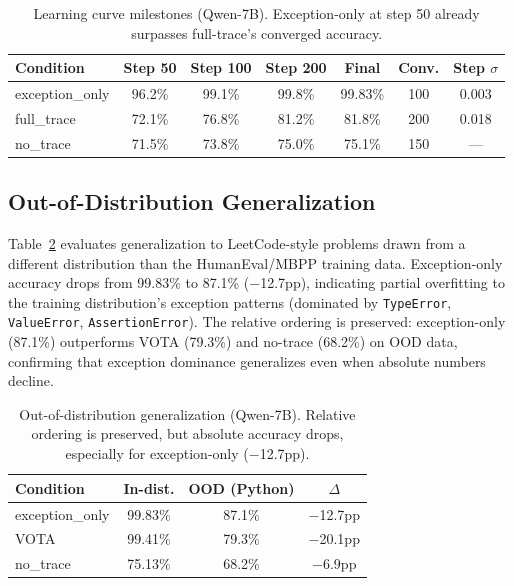 \documentclass[11pt]{article}
\begin{document}
\begin{table}[t]
\centering
\caption{Learning curve milestones (Qwen-7B). Exception-only at step 50 already surpasses full-trace's converged accuracy.}
\label{tab:dynamics}
\small
\begin{tabular}{lcccccc}
\toprule
\textbf{Condition} & \textbf{Step 50} & \textbf{Step 100} & \textbf{Step 200} & \textbf{Final} & \textbf{Conv.} & \textbf{Step $\sigma$} \\
\midrule
exception\_only & 96.2\% & 99.1\% & 99.8\% & 99.83\% & 100 & 0.003 \\
full\_trace & 72.1\% & 76.8\% & 81.2\% & 81.8\% & 200 & 0.018 \\
no\_trace & 71.5\% & 73.8\% & 75.0\% & 75.1\% & 150 & --- \\
\bottomrule
\end{tabular}
\end{table}

\subsection{Out-of-Distribution Generalization}
\label{sec:exp-ood}

Table~\ref{tab:ood} evaluates generalization to LeetCode-style problems drawn from a different distribution than the HumanEval/MBPP training data. Exception-only accuracy drops from 99.83\% to 87.1\% ($-$12.7pp), indicating partial overfitting to the training distribution's exception patterns (dominated by \texttt{TypeError}, \texttt{ValueError}, \texttt{AssertionError}). The relative ordering is preserved: exception-only (87.1\%) outperforms VOTA (79.3\%) and no-trace (68.2\%) on OOD data, confirming that exception dominance generalizes even when absolute numbers decline.

\begin{table}[t]
\centering
\caption{Out-of-distribution generalization (Qwen-7B). Relative ordering is preserved, but absolute accuracy drops, especially for exception-only ($-$12.7pp).}
\label{tab:ood}
\small
\begin{tabular}{lccc}
\toprule
\textbf{Condition} & \textbf{In-dist.} & \textbf{OOD (Python)} & \textbf{$\Delta$} \\
\midrule
exception\_only & 99.83\% & 87.1\% & $-$12.7pp \\
VOTA & 99.41\% & 79.3\% & $-$20.1pp \\
no\_trace & 75.13\% & 68.2\% & $-$6.9pp \\
\bottomrule
\end{tabular}
\end{table}
\end{document}
